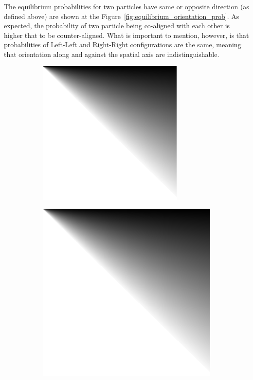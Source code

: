\documentclass[12pt, a4paper]{article}
\newcommand{\figref}[1]{Figure~\ref{#1}}
\begin{document}
The equilibrium probabilities for two particles have same or opposite direction (as defined above) are shown at the \figref{fig:equilibrium_orientation_prob}. As expected, the probability of two particle being co-aligned with each other is higher that to be counter-aligned. What is important to mention, however, is that probabilities of Left-Left and Right-Right configurations are the same, meaning that orientation along and against the spatial axis are indistinguishable.

\begin{figure}
 \centering
 \begin{subfigure}{.45\textwidth}
  \centering
  \includegraphics[width=0.8\textwidth]{Images/dummy.png}
 \end{subfigure}
 \begin{subfigure}{.45\textwidth}
  \centering
  \includegraphics[width=.8\textwidth]{Images/dummy.png}

\end{subfigure}
\end{figure}
\end{document}
